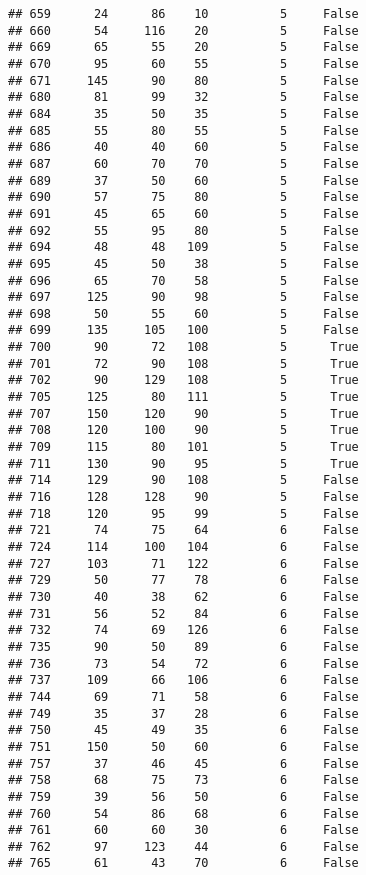 \documentclass[
]{article}
\begin{document}
\begin{verbatim}
## 659      24      86    10          5     False
## 660      54     116    20          5     False
## 669      65      55    20          5     False
## 670      95      60    55          5     False
## 671     145      90    80          5     False
## 680      81      99    32          5     False
## 684      35      50    35          5     False
## 685      55      80    55          5     False
## 686      40      40    60          5     False
## 687      60      70    70          5     False
## 689      37      50    60          5     False
## 690      57      75    80          5     False
## 691      45      65    60          5     False
## 692      55      95    80          5     False
## 694      48      48   109          5     False
## 695      45      50    38          5     False
## 696      65      70    58          5     False
## 697     125      90    98          5     False
## 698      50      55    60          5     False
## 699     135     105   100          5     False
## 700      90      72   108          5      True
## 701      72      90   108          5      True
## 702      90     129   108          5      True
## 705     125      80   111          5      True
## 707     150     120    90          5      True
## 708     120     100    90          5      True
## 709     115      80   101          5      True
## 711     130      90    95          5      True
## 714     129      90   108          5     False
## 716     128     128    90          5     False
## 718     120      95    99          5     False
## 721      74      75    64          6     False
## 724     114     100   104          6     False
## 727     103      71   122          6     False
## 729      50      77    78          6     False
## 730      40      38    62          6     False
## 731      56      52    84          6     False
## 732      74      69   126          6     False
## 735      90      50    89          6     False
## 736      73      54    72          6     False
## 737     109      66   106          6     False
## 744      69      71    58          6     False
## 749      35      37    28          6     False
## 750      45      49    35          6     False
## 751     150      50    60          6     False
## 757      37      46    45          6     False
## 758      68      75    73          6     False
## 759      39      56    50          6     False
## 760      54      86    68          6     False
## 761      60      60    30          6     False
## 762      97     123    44          6     False
## 765      61      43    70          6     False

\end{verbatim}
\end{document}
